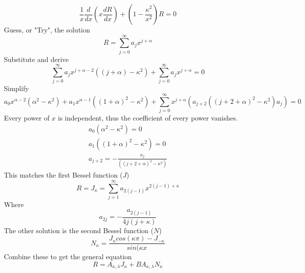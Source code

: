 \documentclass[12pt]{article}
\begin{document}
    \begin{equation} \label{eq: 1-21}
        \frac{1}{x} \frac{d}{dx} (x \frac{dR}{dx}) + \left(1 - \frac{\kappa^2}{x^2} \right) R = 0
    \end{equation}
    Guess, or "Try", the solution
    \begin{equation} \label{eq: 1-22}
        R = \sum_{j=0}^\infty a_j x^{j+\alpha}
    \end{equation}
    Substitute and derive
    \begin{equation} \label{eq: 1-23}
        \sum_{j=0}^\infty a_j x^{j+\alpha-2} ((j+\alpha)-\kappa^2) + \sum_{j=0}^\infty a_j x^{j+\alpha} = 0
    \end{equation}
    Simplify
    \begin{equation} \label{eq: 1-24}
        a_0 x^{\alpha - 2} (\alpha^2 - \kappa^2) + a_1 x^{\alpha - 1}((1+\alpha)^2 - \kappa^2) + \sum_{j=0}^\infty x^{j+\alpha} (a_{j+2}((j+2+\alpha)^2 - \kappa^2) a_j) = 0
    \end{equation}
    Every power of $x$ is independent, thus the coefficient of every power vanishes. 
    \begin{equation} \label{eq: 1-25}
        \begin{split}
            a_0(\alpha^2 - \kappa^2) = 0
            \\ a_1((1+\alpha)^2 - \kappa^2) = 0
            \\ a_{j+2} = -\frac{a_j}{((j+2+\alpha)^2-\kappa^2)}
        \end{split}
    \end{equation}
    This matches the first Bessel function ($J$)
    \begin{equation} \label{eq: 1-26}
        R = J_\kappa = \sum_{j=1}^\infty a_{2(j-1)} x^{2(j-1)+\kappa}
    \end{equation}
    Where
    \begin{equation} \label{eq: 1-27}
        a_{2j} = - \frac{a_{2(j-1)}}{4j(j+\kappa)}
    \end{equation}
    The other solution is the second Bessel function ($N$)
    \begin{equation} \label{eq: 1-28}
        N_\kappa = \frac{J_\kappa cos(\kappa \pi) - J_{-\kappa}}{sin(\kappa x}
    \end{equation}
    Combine these to get the general equation
    \begin{equation} \label{eq: 1-29}
        R = A_{\kappa, \lambda} J_\kappa + BA_{\kappa, \lambda} N_\kappa
    \end{equation}
\end{document}
